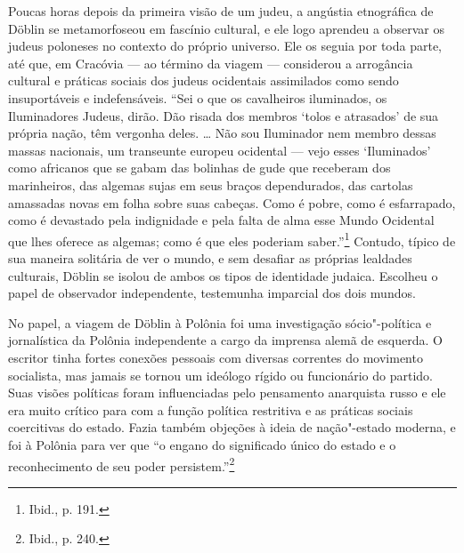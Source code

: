 Poucas horas depois da primeira visão de um judeu, a angústia
etnográfica de Döblin se metamorfoseou em fascínio cultural, e ele logo
aprendeu a observar os judeus poloneses no contexto do próprio universo.
Ele os seguia por toda parte, até que, em Cracóvia --- ao término da
viagem --- considerou a arrogância cultural e práticas sociais dos judeus
ocidentais assimilados como sendo insuportáveis e indefensáveis. ``Sei o
que os cavalheiros iluminados, os Iluminadores Judeus, dirão. Dão risada
dos membros `tolos e atrasados' de sua própria nação, têm vergonha
deles. \ldots{} Não sou Iluminador nem membro dessas massas nacionais,
um transeunte europeu ocidental --- vejo esses `Iluminados' como africanos
que se gabam das bolinhas de gude que receberam dos marinheiros, das
algemas sujas em seus braços dependurados, das cartolas amassadas novas
em folha sobre suas cabeças. Como é pobre, como é esfarrapado, como é
devastado pela indignidade e pela falta de alma esse Mundo Ocidental que
lhes oferece as algemas; como é que eles poderiam saber.''\footnote{Ibid., p. 191.} Contudo, típico de sua maneira solitária de ver o mundo, e sem desafiar as próprias lealdades culturais, Döblin se isolou de ambos
os tipos de identidade judaica. Escolheu o papel de observador
independente, testemunha imparcial dos dois mundos.

\asterisc

No papel, a viagem de Döblin à Polônia foi uma investigação
sócio"-política e jornalística da Polônia independente a cargo da
imprensa alemã de esquerda. O escritor tinha fortes conexões pessoais
com diversas correntes do movimento socialista, mas jamais se tornou um
ideólogo rígido ou funcionário do partido. Suas visões políticas foram
influenciadas pelo pensamento anarquista russo e ele era muito crítico
para com a função política restritiva e as práticas sociais coercitivas
do estado. Fazia também objeções à ideia de nação"-estado moderna, e foi
à Polônia para ver que ``o engano do significado único do estado e o
reconhecimento de seu poder persistem.''\footnote{Ibid., p. 240.}

